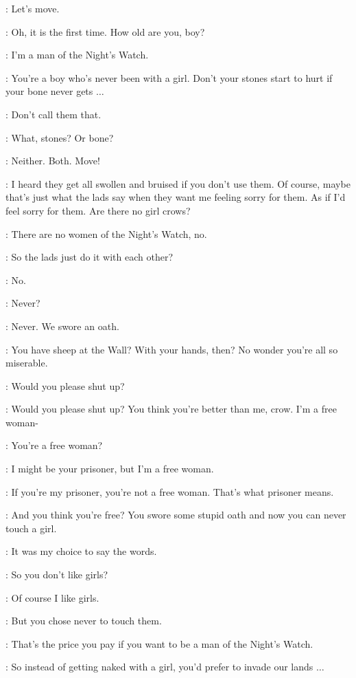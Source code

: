 \JON: Let's move.

\YGRITTE: Oh, it is the first time. How old are you, boy?

\JON: I'm a man of the Night's Watch.

\YGRITTE: You're a boy who's never been with a girl. Don't your stones start to hurt if your bone never gets $\ldots$

\JON: Don't call them that.

\YGRITTE: What, stones? Or bone?

\JON: Neither. Both. Move!


\YGRITTE: I heard they get all swollen and bruised if you don't use them. Of course, maybe that's just what the lads say when they want me feeling sorry for them. As if I'd feel sorry for them. Are there no girl crows?

\JON: There are no women of the Night's Watch, no.

\YGRITTE: So the lads just do it with each other?

\JON: No.

\YGRITTE: Never?

\JON: Never. We swore an oath.

\YGRITTE: You have sheep at the Wall?  With your hands, then?  No wonder you're all so miserable.

\JON: Would you please shut up?

\YGRITTE:  Would you please shut up? You think you're better than me, crow. I'm a free woman-

\JON: You're a free woman?

\YGRITTE: I might be your prisoner, but I'm a free woman.

\JON: If you're my prisoner, you're not a free woman. That's what prisoner means.

\YGRITTE: And you think you're free? You swore some stupid oath and now you can never touch a girl.

\JON: It was my choice to say the words.

\YGRITTE: So you don't like girls?

\JON: Of course I like girls.

\YGRITTE: But you chose never to touch them.

\JON: That's the price you pay if you want to be a man of the Night's Watch.

\YGRITTE: So instead of getting naked with a girl, you'd prefer to invade our lands $\ldots$

